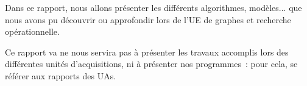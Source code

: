 
Dans ce rapport, nous allons présenter les différents algorithmes,
modèles... que nous avons pu découvrir ou approfondir lors de l'UE
de graphes et recherche opérationnelle.

Ce rapport va ne nous servira pas à présenter les travaux accomplis lors
des différentes unités d'acquisitions, ni à présenter nos programmes~:
pour cela, se référer aux rapports des UAs.
